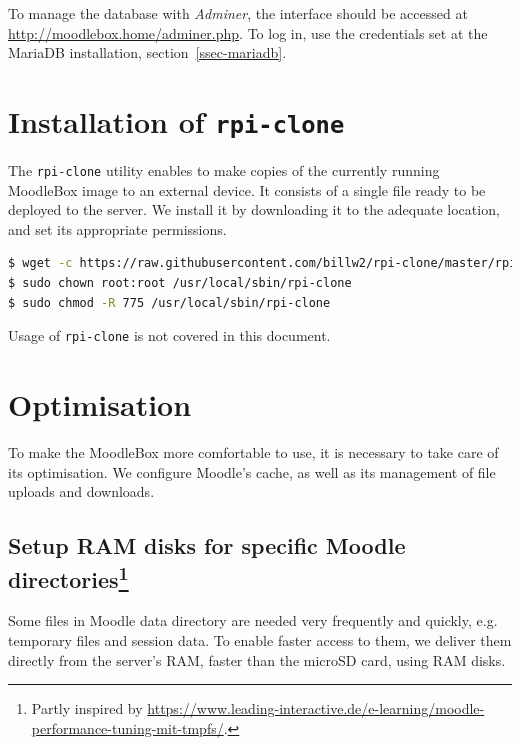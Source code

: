 \documentclass[12pt]{article}
\begin{document}
To manage the database with \textsl{Adminer}, the interface should be accessed at \url{http://moodlebox.home/adminer.php}.
To log in, use the credentials set at the MariaDB installation, section~\ref{ssec-mariadb}.

\section{Installation of \texttt{rpi-clone}}

The \texttt{rpi-clone} utility enables to make copies of the currently running MoodleBox image to an external device.
It consists of a single file ready to be deployed to the server.
We install it by downloading it to the adequate location, and set its appropriate permissions.
\begin{lstlisting}[language=bash]
$ wget -c https://raw.githubusercontent.com/billw2/rpi-clone/master/rpi-clone -O /usr/local/sbin/rpi-clone
$ sudo chown root:root /usr/local/sbin/rpi-clone
$ sudo chmod -R 775 /usr/local/sbin/rpi-clone
\end{lstlisting}

Usage of \texttt{rpi-clone} is not covered in this document.

\section{Optimisation}\label{sec-optimisation}

To make the MoodleBox more comfortable to use, it is necessary to take care of its optimisation.
We configure Moodle's cache, as well as its management of file uploads and downloads.

\subsection[Setup RAM disks for specific Moodle directories]{Setup RAM disks for specific Moodle directories\footnote{Partly inspired by \url{https://www.leading-interactive.de/e-learning/moodle-performance-tuning-mit-tmpfs/}.}}

Some files in Moodle data directory are needed very frequently and quickly, e.g. temporary files and session data.
To enable faster access to them, we deliver them directly from the server's RAM, faster than the microSD card, using RAM disks.
\end{document}
